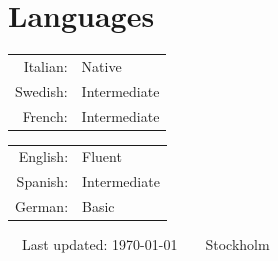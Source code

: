 \documentclass[11pt]{article} %
\begin{document}


\section*{Languages}\startseclist

\begin{minipage}[t]{.45\textwidth}
\begin{tabular}{rl}
Italian: & Native\\
Swedish: & Intermediate\\
French: & Intermediate\\
\end{tabular}
\end{minipage}%
\begin{minipage}[t]{.45\textwidth}
\begin{tabular}{rl}
English: & Fluent\\
Spanish: & Intermediate\\
German: & Basic\\
\end{tabular}
\end{minipage}


\begin{center}
	\scriptsize
	\raisebox{-0.5pt}{\textbullet}~~Last updated: \today~~\raisebox{-0.5pt}{\textbullet}~~Stockholm~~\raisebox{-0.5pt}{\textbullet}
\end{center}
\end{document}
